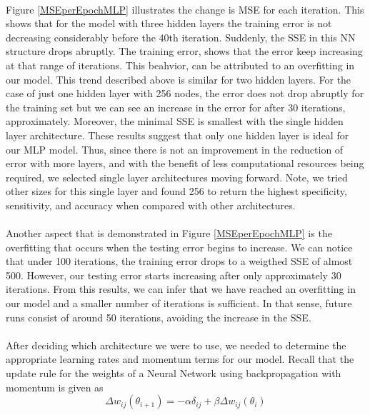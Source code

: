 \documentclass[11.5pt]{article}
\newcounter{Figure}
\begin{document}
\paragraph{} Figure \ref{MSEperEpochMLP} illustrates the change is MSE for each iteration. This shows that for the model with three hidden layers the training error is not decreasing considerably before the 40th iteration. Suddenly, the SSE in this NN structure drops abruptly. The training error, shows that the error keep increasing at that range of iterations. This beahvior, can be attributed to an overfitting in our model.  This trend described above is similar for two hidden layers. For the case of just one hidden layer with 256 nodes, the error does not drop abruptly for the training set but we can see an increase in the error for after 30 iterations, approximately. Moreover, the minimal SSE is smallest with the single hidden layer architecture. These results suggest that only one hidden layer is ideal for our MLP model. Thus, since there is not an improvement in the reduction of error with more layers, and with the benefit of less computational resources being required, we selected single layer architectures moving forward. Note, we tried other sizes for this single layer and found 256 to return the highest specificity, sensitivity, and accuracy when compared with other architectures. 
 
\paragraph{} Another aspect that is demonstrated in Figure \ref{MSEperEpochMLP} is the overfitting that occurs when the testing error begins to increase. We can notice that under 100 iterations, the training error drops to a weigthed SSE of almost 500. However, our testing error starts increasing after only approximately 30 iterations. From this results, we can infer that we have reached an overfitting in our model and a smaller number of iterations is sufficient. In that sense, future runs consist of around 50 iterations, avoiding the increase in the SSE.

\paragraph{} After deciding which architecture we were to use, we needed to determine the appropriate learning rates and momentum terms for our model. Recall that the update rule for the weights of a Neural Network using backpropagation with momentum is given as 
$$ \Delta w_{ij} (\theta_{i+1}) = -\alpha \delta_{ij}  + \beta \Delta w_{ij} (\theta_i)$$
\end{document}
